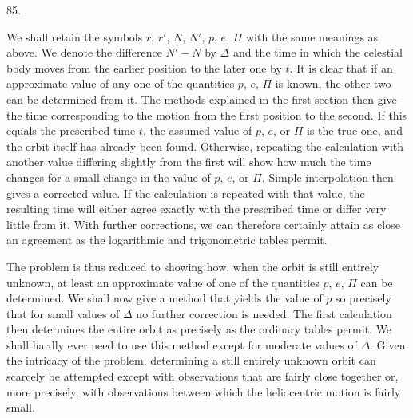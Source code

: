 \par{}\medskip
\hypertarget{native-114-article085}{}
\begin{center}85.\end{center}
We shall retain the symbols $r$, $r'$, $N$, $N'$, $p$, $e$, $\Pi$ with the same meanings as above. We denote the difference $N'-N$ by $\Delta$ and the time in which the celestial body moves from the earlier position to the later one by $t$. It is clear that if an approximate value of any one of the quantities $p$, $e$, $\Pi$ is known, the other two can be determined from it. The methods explained in the first section then give the time corresponding to the motion from the first position to the second. If this equals the prescribed time $t$, the assumed value of $p$, $e$, or $\Pi$ is the true one, and the orbit itself has already been found. Otherwise, repeating the calculation with another value differing slightly from the first will show how much the time changes for a small change in the value of $p$, $e$, or $\Pi$. Simple interpolation then gives a corrected value. If the calculation is repeated with that value, the resulting time will either agree exactly with the prescribed time or differ very little from it. With further corrections, we can therefore certainly attain as close an agreement as the logarithmic and trigonometric tables permit.

The problem is thus reduced to showing how, when the orbit is still entirely unknown, at least an approximate value of one of the quantities $p$, $e$, $\Pi$ can be determined. We shall now give a method that yields the value of $p$ so precisely that for small values of $\Delta$ no further correction is needed. The first calculation then determines the entire orbit as precisely as the ordinary tables permit. We shall hardly ever need to use this method except for moderate values of $\Delta$. Given the intricacy of the problem, determining a still entirely unknown orbit can scarcely be attempted except with observations that are fairly close together or, more precisely, with observations between which the heliocentric motion is fairly small.
